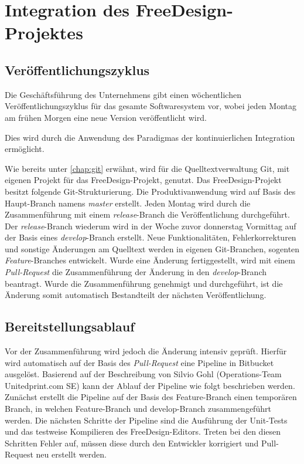\section{Integration des FreeDesign-Projektes}

\subsection{Veröffentlichungszyklus}
Die Geschäftsführung des Unternehmens gibt einen wöchentlichen Veröffentlichungszyklus für das gesamte Softwaresystem vor, wobei jeden Montag am frühen Morgen eine neue Version veröffentlicht wird. 

Dies wird durch die Anwendung des Paradigmas der kontinuierlichen Integration ermöglicht. 

Wie bereits unter \ref{chap:git} erwähnt, wird für die Quelltextverwaltung Git, mit eigenen Projekt für das FreeDesign-Projekt, genutzt.
Das FreeDesign-Projekt besitzt folgende Git-Strukturierung. Die Produktivanwendung wird auf Basis des Haupt-Branch namens \emph{master} erstellt. 
Jeden Montag wird durch die Zusammenführung mit einem \emph{release}-Branch die Veröffentlichung durchgeführt. 
Der \emph{release}-Branch wiederum wird in der Woche zuvor donnerstag Vormittag auf der Basis eines \emph{develop}-Branch erstellt. Neue Funktionalitäten, Fehlerkorrekturen und sonstige Änderungen am Quelltext werden in eigenen Git-Branchen, sogenten \emph{Feature}-Branches entwickelt. Wurde eine Änderung fertiggestellt, wird mit einem \emph{Pull-Request} die Zusammenführung der Änderung in den \emph{develop}-Branch beantragt.
Wurde die Zusammenführung genehmigt und durchgeführt, ist die Änderung somit automatisch Bestandteilt der nächsten Veröffentlichung. 


\subsection{Bereitstellungsablauf}
Vor der Zusammenführung wird jedoch die Änderung intensiv geprüft. Hierfür wird automatisch auf der Basis des \emph{Pull-Request}
eine Pipeline in Bitbucket ausgelöst. 
Basierend auf der Beschreibung von Silvio Gohl (Operations-Team Unitedprint.com SE) kann der Ablauf der Pipeline wie folgt beschrieben werden.
Zunächst erstellt die Pipeline auf der Basis des Feature-Branch einen temporären Branch, in welchen Feature-Branch und develop-Branch zusammengeführt werden. 
Die nächsten Schritte der Pipeline sind die Ausführung der Unit-Tests und das testweise Kompilieren des FreeDesign-Editors. Treten bei den diesen Schritten Fehler auf, müssen diese durch den Entwickler korrigiert und Pull-Request neu erstellt werden. 

